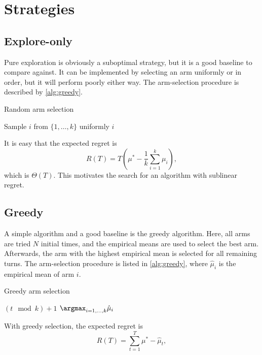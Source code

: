 \section{Strategies}
\subsection{Explore-only}
Pure exploration is obviously a suboptimal strategy, but it is a good baseline to compare against.
It can be implemented by selecting an arm uniformly or in order, but it will perform poorly either way.
The arm-selection procedure is described by \cref{alg:greedy}.
\begin{algorithm}
    \caption{Random arm selection}
    \label{alg:random}
    \begin{algorithmic}
        \State Sample $i$ from $\{1,\dots, k\}$ uniformly
        \State \Return $i$
        \EndProcedure
    \end{algorithmic}
\end{algorithm}

It is easy that the expected regret is
\begin{equation}
    R(T) = T\left(\mu^* - \frac{1}{k}\sum_{i=1}^k \mu_i\right),
\end{equation}
which is $\Theta(T)$.
This motivates the search for an algorithm with sublinear regret.


\subsection{Greedy}
A simple algorithm and a good baseline is the greedy algorithm.
Here, all arms are tried $N$ initial times, and the empirical means are used to select the best arm.
Afterwards, the arm with the highest empirical mean is selected for all remaining turns.
The arm-selection procedure is listed in \cref{alg:greedy}, where $\hat{\mu}_i$ is the empirical mean of arm $i$.
\begin{algorithm}
    \caption{Greedy arm selection}
    \label{alg:greedy}
    \begin{algorithmic}
        \State \Return $(t \mod k) + 1$
        \Else
        \State \Return $\argmax_{i=1,\dots,k} \hat{\mu}_i$
        \EndIf
        \EndProcedure
    \end{algorithmic}
\end{algorithm}

With greedy selection, the expected regret is
\begin{equation}
    R(T) = \sum_{t=1}^T \mu^* - \hat{\mu}_t,
\end{equation}



